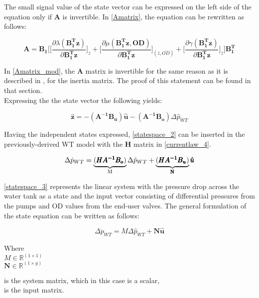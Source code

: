 The small signal value of the state vector can be expressed on the left side of the equation only if $\pmb{A}$ is invertible. In \eqref{Amatrix}, the equation can be rewritten as follows: 

\begin{equation}
  \pmb{A} = \pmb{B_1}\Bigg[ \bigg[ \frac{\partial{\lambda(\pmb{{B_1^{T}}}\pmb{z})}}{{\partial{\pmb{{B_1^{T}}}\pmb{z}}}}   \bigg]_{\bar{z}} +
\bigg[ \frac{\partial{\mu(\pmb{{B_1^{T}}}\pmb{z}, \pmb{OD})}}{{\partial{\pmb{{B_1^{T}}}\pmb{z}}}}  \bigg]_{(\bar{z}, \bar{OD})} +  \bigg[ \frac{\partial{\gamma(\pmb{{B_1^{T}}}\pmb{z})}}{{\partial{\pmb{{B_1^{T}}}\pmb{z}}}}   \bigg]_{\bar{z}}\Bigg] \pmb{{B_1^{T}}}
\label{Amatrix_mod}
\end{equation}

In \eqref{Amatrix_mod}, the $\pmb{A}$ matrix is invertible for the same reason as it is described in , for the inertia matrix. The proof of this statement can be found in that section. 
\\
Expressing the the state vector the following yields:

\begin{equation}
 \pmb{\hat{z}} = -(\pmb{A^{-1}}\pmb{B_u})\pmb{\hat{u}} - (\pmb{A^{-1}}\pmb{B_o})\Delta \hat{p}_{WT}    
 \label{statespace_2}
\end{equation}

Having the independent states expressed, \eqref{statespace_2} can be inserted in the previously-derived WT model with the $\pmb{H}$ matrix in \eqref{currentlaw_4}. 

\begin{equation}
\Delta \dot{p}_{WT} = \underbrace{(\pmb{H}\pmb{A^{-1}}\pmb{B_o})}_\text{M}\Delta \hat{p}_{WT}  + \underbrace{(\pmb{H}\pmb{A^{-1}}\pmb{B_u})}_\text{\pmb{N}}\pmb{\hat{u}}  
 \label{statespace_3}
\end{equation}

\eqref{statespace_3} represents the linear system with the pressure drop across the water tank as a state and the input vector consisting of differential pressures from the pumps and OD values from the end-user valves. The general formulation of the state equation can be written as follows:  

\begin{equation}
\Delta \dot{p}_{WT} = M \Delta \hat{p}_{WT}  + \pmb{N}\pmb{\hat{u}}  
 \label{statespace_4}
\end{equation}

\begin{minipage}[t]{0.20\textwidth}
Where\\
\hspace*{8mm} $M \in \mathbb{R}^{(1 \times 1)} $ \\
\hspace*{8mm} $\pmb{N} \in \pmb{\mathbb{R}}^{(1 \times g)} $ 
\end{minipage}
\begin{minipage}[t]{0.68\textwidth}
\vspace*{2mm}
is the system matrix, which in this case is a scalar, \\
is the input matrix.
\end{minipage} 

